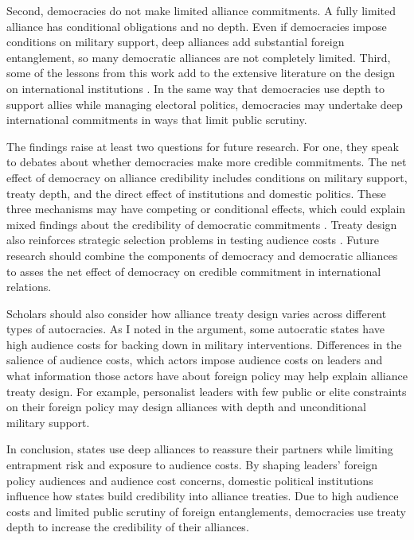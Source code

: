 \documentclass[12pt]{article}
\begin{document}
Second, democracies do not make limited alliance commitments. 
A fully limited alliance has conditional obligations and no depth.
Even if democracies impose conditions on military support, deep alliances add substantial foreign entanglement, so many democratic alliances are not completely limited.  
Third, some of the lessons from this work add to the extensive literature on the design on international institutions \citep{DownesRocke1995, MartinSimmons1998, Koremenosetal2001, Thompson2010}.
In the same way that democracies use depth to support allies while managing electoral politics, democracies may undertake deep international commitments in ways that limit public scrutiny. 


The findings raise at least two questions for future research.  
For one, they speak to debates about whether democracies make more credible commitments. 
The net effect of democracy on alliance credibility includes conditions on military support, treaty depth, and the direct effect of institutions and domestic politics. 
These three mechanisms may have competing or conditional effects, which could explain mixed findings about the credibility of democratic commitments \citep{Schultz1999, Leeds1999, Thyne2012, DownesSechser2012, PotterBaum2014}.
Treaty design also reinforces strategic selection problems in testing audience costs \citep{Schultz2001}. 
Future research should combine the components of democracy and democratic alliances to asses the net effect of democracy on credible commitment in international relations. 


Scholars should also consider how alliance treaty design varies across different types of autocracies. 
As I noted in the argument, some autocratic states have high audience costs for backing down in military interventions. 
Differences in the salience of audience costs, which actors impose audience costs on leaders and what information those actors have about foreign policy \citep{Weeks2008} may help explain alliance treaty design.
For example, personalist leaders with few public or elite constraints on their foreign policy may design alliances with depth and unconditional military support. 


In conclusion, states use deep alliances to reassure their partners while limiting entrapment risk and exposure to audience costs. 
By shaping leaders' foreign policy audiences and audience cost concerns, domestic political institutions influence how states build credibility into alliance treaties.
Due to high audience costs and limited public scrutiny of foreign entanglements, democracies use treaty depth to increase the credibility of their alliances. 



 
 
\end{document}
